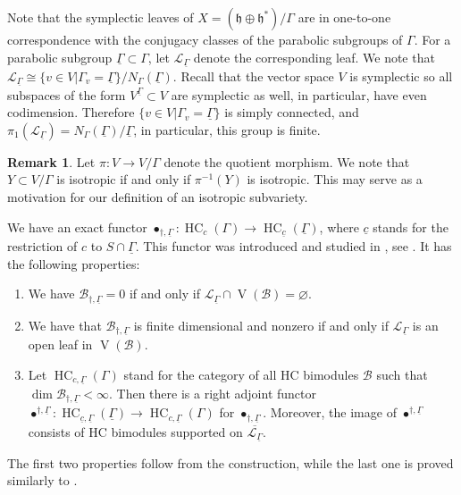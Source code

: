 \documentclass[12pt]{amsart}
\newcommand{\HC}{\operatorname{HC}}
\newcommand{\VA}{\operatorname{V}}
\newcommand{\B}{\mathcal{B}}
\newcommand{\h}{\mathfrak{h}}
\theoremstyle{definition}
\newtheorem{Rem}[Thm]{Remark}
\begin{document}
Note that the symplectic leaves of $X=(\h\oplus \h^*)/\Gamma$ are in one-to-one correspondence
with the conjugacy classes of the parabolic subgroups of $\Gamma$. For a parabolic
subgroup $\underline{\Gamma}\subset \Gamma$, let $\mathcal{L}_{\underline{\Gamma}}$ denote
the corresponding leaf. We note that $\mathcal{L}_{\underline{\Gamma}}\cong \{v\in V| \Gamma_v=\underline{\Gamma}\}/N_{\Gamma}(\underline{\Gamma})$. Recall that the vector space $V$ is  symplectic
so  all subspaces of the form $V^{\underline{\Gamma}}\subset V$ are symplectic as well, in particular,
have even codimension.
Therefore $\{v\in V| \Gamma_v=\underline{\Gamma}\}$ is simply connected, and $\pi_1(\mathcal{L}_{\underline{\Gamma}})=
N_\Gamma(\underline{\Gamma})/\underline{\Gamma}$, in particular, this group is finite.

\begin{Rem}
Let $\pi:V\rightarrow V/\Gamma$ denote the quotient morphism. We note that $Y\subset V/\Gamma$
is isotropic if and only if $\pi^{-1}(Y)$ is isotropic. This may serve as a motivation for
our definition of an isotropic subvariety.
\end{Rem}

We have an exact functor $\bullet_{\dagger,\underline{\Gamma}}: \operatorname{HC}_c(\Gamma)\rightarrow \operatorname{HC}_{\underline{c}}(\underline{\Gamma})$, where  $\underline{c}$ stands for the restriction of
$c$ to $S\cap \underline{\Gamma}$. This functor was introduced and studied  in \cite{sraco}, see
\cite[Section 3.6]{sraco}. It has the following properties:
\begin{enumerate}
\item We have $\B_{\dagger,\underline{\Gamma}}=0$ if and only if $\mathcal{L}_{\underline{\Gamma}}\cap \VA(\B)=\varnothing$.
\item We have that $\B_{\dagger,\underline{\Gamma}}$ is finite dimensional and nonzero if
and only if $\mathcal{L}_{\underline{\Gamma}}$ is an open leaf in $\VA(\B)$.
\item Let $\HC_{c,\underline{\Gamma}}(\Gamma)$ stand for the category of all HC bimodules
$\B$ such that $\dim\B_{\dagger,\underline{\Gamma}}<\infty$. Then there is a right adjoint
functor $\bullet^{\dagger,\underline{\Gamma}}:\HC_{\underline{c},\underline{\Gamma}}(\underline{\Gamma})\rightarrow \HC_{c,\underline{\Gamma}}(\Gamma)$ for $\bullet_{\dagger,\underline{\Gamma}}$. Moreover, the image
of $\bullet^{\dagger,\underline{\Gamma}}$ consists of  HC bimodules supported on
$\overline{\mathcal{L}_{\underline{\Gamma}}}$.
\end{enumerate}
The first two properties follow from the construction, while the last one is proved similarly
to \cite[Proposition 3.7.2]{sraco}.
\end{document}
